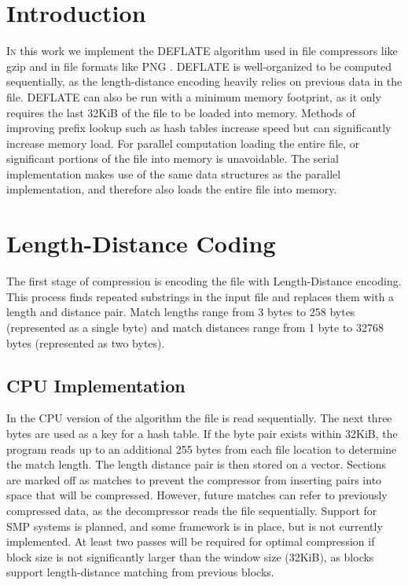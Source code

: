 \documentclass[twoside]{article}
\begin{document}
\begin{multicols}{2} %

\section{Introduction}

\lettrine[nindent=0em,lines=3]{I} n this work we implement the DEFLATE algorithm used in file compressors like gzip and in file formats like PNG \cite{RFC1950}. DEFLATE is well-organized to be computed sequentially, as the length-distance encoding heavily relies on previous data in the file. DEFLATE can also be run with a minimum memory footprint, as it only requires the last 32KiB of the file to be loaded into memory. Methods of improving prefix lookup such as hash tables increase speed but can significantly increase memory load. For parallel computation loading the entire file, or significant portions of the file into memory is unavoidable. The serial implementation makes use of the same data structures as the parallel implementation, and therefore also loads the entire file into memory.


\section{Length-Distance Coding}

The first stage of compression is encoding the file with Length-Distance encoding. This process finds repeated substrings in the input file and replaces them with a length and distance pair. Match lengths range from 3 bytes to 258 bytes (represented as a single byte) and match distances range from 1 byte to 32768 bytes (represented as two bytes).

\subsection{CPU Implementation}

In the CPU version of the algorithm the file is read sequentially. The next three bytes are used as a key for a hash table. If the byte pair exists within 32KiB, the program reads up to an additional 255 bytes from each file location to determine the match length. The length distance pair is then stored on a vector. Sections are marked off as matches to prevent the compressor from inserting pairs into space that will be compressed. However, future matches can refer to previously compressed data, as the decompressor reads the file sequentially. Support for SMP systems is planned, and some framework is in place, but is not currently implemented. At least two passes will be required for optimal compression if block size is not significantly larger than the window size (32KiB), as blocks support length-distance matching from previous blocks.


\end{multicols}
\end{document}
